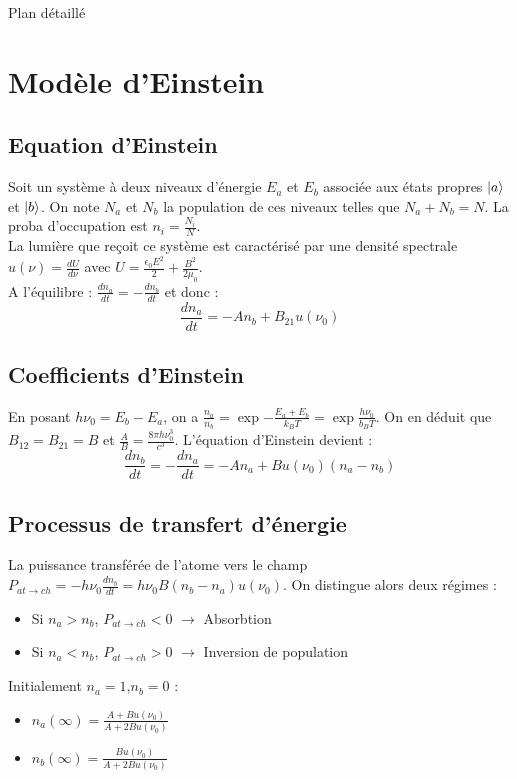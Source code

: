\begin{reportBlock}{Plan détaillé}
\section{Modèle d'Einstein}
\subsection{Equation d'Einstein}
Soit un système à deux niveaux d'énergie $E_a$ et $E_b$ associée aux états propres $\ket{a}$ et $\ket{b}$. On note $N_a$ et $N_b$ la population de ces niveaux telles que $N_a+N_b=N$. La proba d'occupation est $n_i=\frac{N_i}{N}$.\\
La lumière que reçoit ce système est caractérisé par une densité spectrale $u(\nu)=\frac{dU}{d\nu}$ avec $U=\frac{\epsilon_0E^2}{2}+\frac{B^2}{2\mu_0}$.\\


A l'équilibre : $\frac{dn_a}{dt}=-\frac{dn_b}{dt}$ et donc : 
\begin{equation}
    \frac{dn_a}{dt} = -An_b + B_{21}u(\nu_0)
\end{equation}
\subsection{Coefficients d'Einstein}

En posant $h\nu_0 = E_b - E_a$, on a $\frac{n_a}{n_b}=\exp{-\frac{E_a+E_b}{k_BT}} = \exp{\frac{h\nu_0}{b_BT}}$. On en déduit que $B_{12} = B_{21} = B$ et $\frac{A}{B}=\frac{8\pi h\nu_0^3}{c^3}$. L'équation d'Einstein devient : 
\begin{equation}
    \frac{dn_b}{dt} = -\frac{dn_a}{dt} = -An_a + Bu(\nu_0)(n_a-n_b)
\end{equation}

\subsection{Processus de transfert d'énergie}
La puissance transférée de l'atome vers le champ $P_{at\rightarrow ch}=-h\nu_0\frac{dn_b}{dt} = h\nu_0B(n_b-n_a)u(\nu_0)$. On distingue alors deux régimes : 
\begin{itemize}
    \item Si $n_a>n_b$, $P_{at\rightarrow ch}<0$ $\longrightarrow$ Absorbtion
    \item Si $n_a<n_b$, $P_{at\rightarrow ch}>0$ $\longrightarrow$ Inversion de population
\end{itemize}

Initialement $n_a=1$,$n_b=0$ : 
\begin{itemize}
    \item $n_a(\infty) = \frac{A + Bu(\nu_0)}{A + 2Bu(\nu_0)}$
    \item $n_b(\infty) = \frac{Bu(\nu_0)}{A + 2Bu(\nu_0)}$
\end{itemize}
\end{reportBlock}


